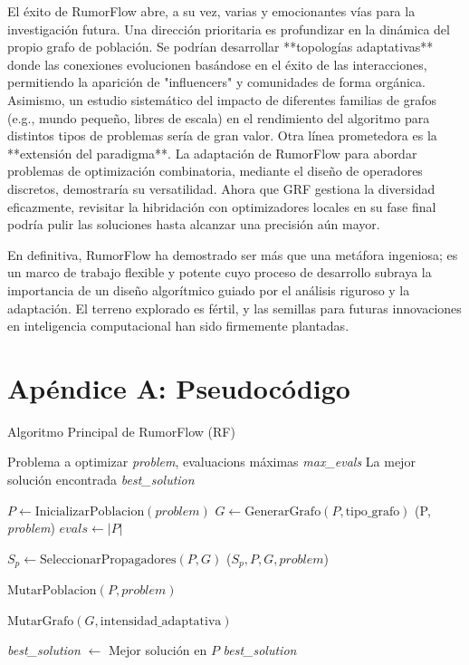 \documentclass[11pt,a4paper]{article}
\begin{document}
El éxito de RumorFlow abre, a su vez, varias y emocionantes vías para la investigación futura. Una dirección prioritaria es profundizar en la dinámica del propio grafo de población. Se podrían desarrollar **topologías adaptativas** donde las conexiones evolucionen basándose en el éxito de las interacciones, permitiendo la aparición de "influencers" y comunidades de forma orgánica. Asimismo, un estudio sistemático del impacto de diferentes familias de grafos (e.g., mundo pequeño, libres de escala) en el rendimiento del algoritmo para distintos tipos de problemas sería de gran valor. Otra línea prometedora es la **extensión del paradigma**. La adaptación de RumorFlow para abordar problemas de optimización combinatoria, mediante el diseño de operadores discretos, demostraría su versatilidad. Ahora que GRF gestiona la diversidad eficazmente, revisitar la hibridación con optimizadores locales en su fase final podría pulir las soluciones hasta alcanzar una precisión aún mayor.

En definitiva, RumorFlow ha demostrado ser más que una metáfora ingeniosa; es un marco de trabajo flexible y potente cuyo proceso de desarrollo subraya la importancia de un diseño algorítmico guiado por el análisis riguroso y la adaptación. El terreno explorado es fértil, y las semillas para futuras innovaciones en inteligencia computacional han sido firmemente plantadas.
\newpage
\appendix

\section{Apéndice A: Pseudocódigo}

\begin{algorithm}[h!]
\caption{Algoritmo Principal de RumorFlow (RF)}
\label{alg:rf}
\begin{algorithmic}[1]
\Require Problema a optimizar \textit{problem}, evaluacions máximas \textit{max\_evals}
\Ensure La mejor solución encontrada \textit{best\_solution}

\State $P \leftarrow \text{InicializarPoblacion}(\textit{problem})$
\State $G \leftarrow \text{GenerarGrafo}(P, \text{tipo\_grafo})$
\State {}(P, \textit{problem})
\State $\textit{evals} \leftarrow |P|$

    \State $S_p \leftarrow \text{SeleccionarPropagadores}(P, G)$ 
    \State {}($S_p, P, G, \textit{problem}$) 
    
    \State $\text{MutarPoblacion}(P, \textit{problem})$
    
        \State $\text{MutarGrafo}(G, \text{intensidad\_adaptativa})$
    \EndIf
\EndWhile

\State \textit{best\_solution} $\leftarrow$ Mejor solución en $P$
\State \Return \textit{best\_solution}
\end{algorithmic}
\end{algorithm}
\end{document}
